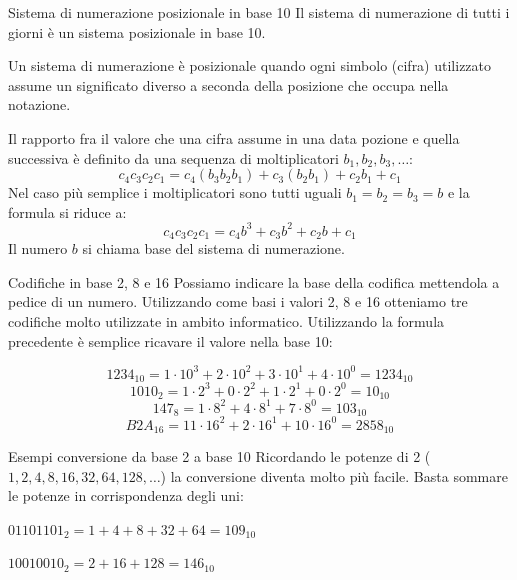 \documentclass[aspectratio=169]{beamer}
\begin{document}
\begin{frame}{Sistema di numerazione posizionale in base 10}
Il sistema di numerazione di tutti i giorni è un sistema \alert{posizionale} in \alert{base 10}.

\pause
Un sistema di numerazione è \alert{posizionale} quando ogni simbolo (cifra) utilizzato assume un significato diverso a seconda della posizione che occupa nella notazione.

\pause
Il rapporto fra il valore che una cifra assume in una data pozione e quella successiva è definito da una sequenza di moltiplicatori $b_1, b_2, b_3, \dots$:
\[c_4c_3c_2c_1 = c_4(b_3b_2b_1) + c_3(b_2b_1) + c_2b_1 + c_1\]
\pause
Nel caso più semplice i moltiplicatori sono tutti uguali $b_1 = b_2 = b_3 = b$ e la formula si riduce a:
\[c_4c_3c_2c_1 = c_4b^3 + c_3b^2 + c_2b + c_1\]
Il numero $b$ si chiama \alert{base} del sistema di numerazione.
\end{frame}

\begin{frame}{Codifiche in base 2, 8 e 16}
Possiamo indicare la base della codifica mettendola a pedice di un numero.
Utilizzando come basi i valori 2, 8 e 16 otteniamo tre codifiche molto utilizzate in ambito informatico.
Utilizzando la formula precedente è semplice ricavare il valore nella base 10:

\[1234_{10} = 1\cdot10^3 + 2\cdot10^2 + 3\cdot10^1 + 4\cdot10^0 = 1234_{10}\]
\pause
\[1010_{2}  = 1\cdot2^3  + 0\cdot2^2  + 1\cdot2^1  + 0\cdot2^0 = 10_{10}\]
\pause
\[147_8 = 1\cdot8^2 + 4\cdot8^1 + 7\cdot8^0 = 103_{10}\]
\pause
\[B2A_{16} = 11\cdot16^2 + 2\cdot16^1 + 10\cdot16^0 = 2858_{10}\]
\end{frame}

\begin{frame}{Esempi conversione da base 2 a base 10}
Ricordando le potenze di 2 ($1,2,4,8,16,32,64,128,\dots$) la conversione diventa molto più facile. Basta sommare le potenze in corrispondenza degli uni:

$01101101_2 = 1+4+8+32+64 = 109_{10}$

$10010010_2 = 2+16+128 = 146_{10}$
\end{frame}
\end{document}
